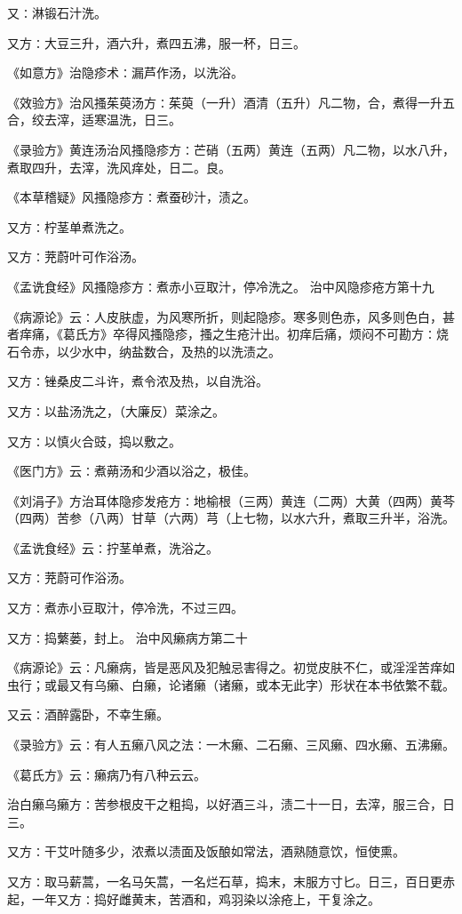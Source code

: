 \documentclass[a4paper,12pt,UTF8,twoside]{ctexbook}
\begin{document}
又∶淋锻石汁洗。

又方∶大豆三升，酒六升，煮四五沸，服一杯，日三。

《如意方》治隐疹术∶漏芦作汤，以洗浴。

《效验方》治风搔茱萸汤方∶茱萸（一升）酒清（五升）凡二物，合，煮得一升五合，绞去滓，适寒温洗，日三。

《录验方》黄连汤治风搔隐疹方∶芒硝（五两）黄连（五两）凡二物，以水八升，煮取四升，去滓，洗风痒处，日二。良。

《本草稽疑》风搔隐疹方∶煮蚕砂汁，渍之。

又方∶柠茎单煮洗之。

又方∶茺蔚叶可作浴汤。

《孟诜食经》风搔隐疹方∶煮赤小豆取汁，停冷洗之。
治中风隐疹疮方第十九

《病源论》云∶人皮肤虚，为风寒所折，则起隐疹。寒多则色赤，风多则色白，甚者痒痛，《葛氏方》卒得风搔隐疹，搔之生疮汁出。初痒后痛，烦闷不可勘方∶烧石令赤，以少水中，纳盐数合，及热的以洗渍之。

又方∶锉桑皮二斗许，煮令浓及热，以自洗浴。

又方∶以盐汤洗之，（大廉反）菜涂之。

又方∶以慎火合豉，捣以敷之。

《医门方》云∶煮蒴汤和少酒以浴之，极佳。

《刘涓子》方治耳体隐疹发疮方∶地榆根（三两）黄连（二两）大黄（四两）黄芩（四两）苦参（八两）甘草（六两）芎（上七物，以水六升，煮取三升半，浴洗。

《孟诜食经》云∶拧茎单煮，洗浴之。

又方∶茺蔚可作浴汤。

又方∶煮赤小豆取汁，停冷洗，不过三四。

又方∶捣蘩蒌，封上。
治中风癞病方第二十

《病源论》云∶凡癞病，皆是恶风及犯触忌害得之。初觉皮肤不仁，或淫淫苦痒如虫行；或最又有乌癞、白癞，论诸癞（诸癞，或本无此字）形状在本书依繁不载。

又云∶酒醉露卧，不幸生癞。

《录验方》云∶有人五癞八风之法∶一木癞、二石癞、三风癞、四水癞、五沸癞。

《葛氏方》云∶癞病乃有八种云云。

治白癞乌癞方∶苦参根皮干之粗捣，以好酒三斗，渍二十一日，去滓，服三合，日三。

又方∶干艾叶随多少，浓煮以渍面及饭酿如常法，酒熟随意饮，恒使熏。

又方∶取马薪蒿，一名马矢蒿，一名烂石草，捣末，末服方寸匕。日三，百日更赤起，一年又方∶捣好雌黄末，苦酒和，鸡羽染以涂疮上，干复涂之。
\end{document}
